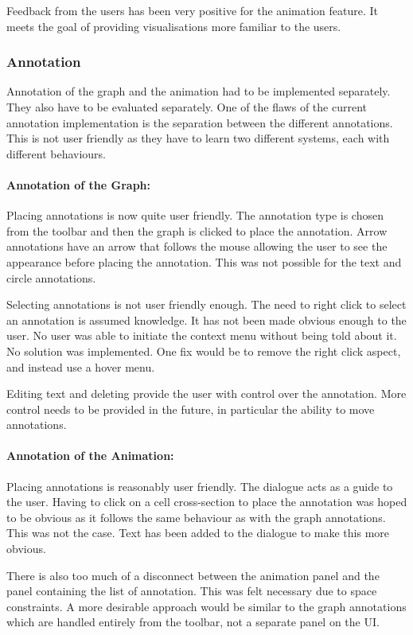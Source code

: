 Feedback from the users has been very positive for the animation feature.  It meets the goal of providing visualisations more familiar to the users.

\subsubsection{Annotation}

Annotation of the graph and the animation had to be implemented separately.  They also have to be evaluated separately.  One of the flaws of the current annotation implementation is the separation between the different annotations.  This is not user friendly as they have to learn two different systems, each with different behaviours.

\paragraph*{Annotation of the Graph:} Placing annotations is now quite user friendly.  The annotation type is chosen from the toolbar and then the graph is clicked to place the annotation.  Arrow annotations have an arrow that follows the mouse allowing the user to see the appearance before placing the annotation.  This was not possible for the text and circle annotations.

Selecting annotations is not user friendly enough.  The need to right click to select an annotation is assumed knowledge.  It has not been made obvious enough to the user.  No user was able to initiate the context menu without being told about it.  No solution was implemented.  One fix would be to remove the right click aspect, and instead use a hover menu.

Editing text and deleting provide the user with control over the annotation. More control needs to be provided in the future, in particular the ability to move annotations.

\paragraph*{Annotation of the Animation:} Placing annotations is reasonably user friendly.  The dialogue acts as a guide to the user.  Having to click on a cell cross-section to place the annotation was hoped to be obvious as it follows the same behaviour as with the graph annotations.  This was not the case.  Text has been added to the dialogue to make this more obvious.

There is also too much of a disconnect between the animation panel and the panel containing the list of annotation.  This was felt necessary due to space constraints.  A more desirable approach would be similar to the graph annotations which are handled entirely from the toolbar, not a separate panel on the \ac{UI}.

